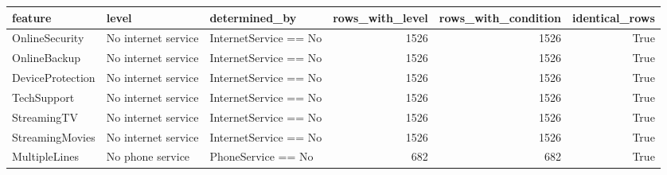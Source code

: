 \begin{tabular}{lllrrr}
\toprule
feature & level & determined\_by & rows\_with\_level & rows\_with\_condition & identical\_rows \\
\midrule
OnlineSecurity & No internet service & InternetService == No & 1526 & 1526 & True \\
OnlineBackup & No internet service & InternetService == No & 1526 & 1526 & True \\
DeviceProtection & No internet service & InternetService == No & 1526 & 1526 & True \\
TechSupport & No internet service & InternetService == No & 1526 & 1526 & True \\
StreamingTV & No internet service & InternetService == No & 1526 & 1526 & True \\
StreamingMovies & No internet service & InternetService == No & 1526 & 1526 & True \\
MultipleLines & No phone service & PhoneService == No & 682 & 682 & True \\
\bottomrule
\end{tabular}
